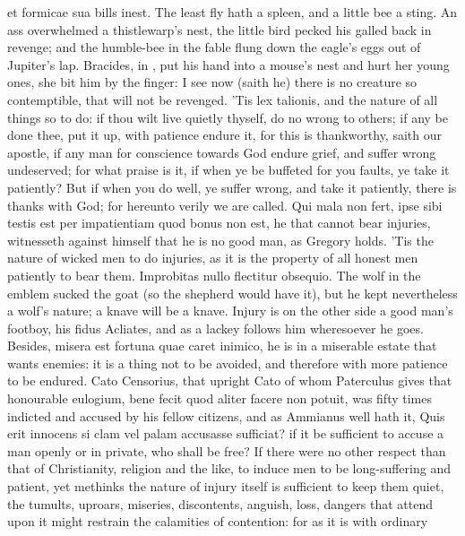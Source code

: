{et formicae sua bills inest. The least fly hath a spleen, and a little
bee a sting. An ass overwhelmed a thistlewarp's nest, the little
bird pecked his galled back in revenge; and the humble-bee in the fable
flung down the eagle's eggs out of Jupiter's lap. Bracides, in
\Plutarch, put his hand into a mouse's nest and hurt her young ones, she
bit him by the finger: I see now (saith he) there is no creature
so contemptible, that will not be revenged. 'Tis lex talionis, and the
nature of all things so to do: if thou wilt live quietly thyself,
do no wrong to others; if any be done thee, put it up, with
patience endure it, for this is thankworthy, saith our apostle,
if any man for conscience towards God endure grief, and suffer wrong
undeserved; for what praise is it, if when ye be buffeted for you
faults, ye take it patiently? But if when you do well, ye suffer wrong,
and take it patiently, there is thanks with God; for hereunto verily we
are called. Qui mala non fert, ipse sibi testis est per impatientiam
quod bonus non est, he that cannot bear injuries, witnesseth against
himself that he is no good man, as Gregory holds. 'Tis the nature
of wicked men to do injuries, as it is the property of all honest men
patiently to bear them. Improbitas nullo flectitur obsequio. The wolf
in the emblem sucked the goat (so the shepherd would have it),
but he kept nevertheless a wolf's nature; a knave will be a
knave. Injury is on the other side a good man's footboy, his fidus
Acliates, and as a lackey follows him wheresoever he goes. Besides,
misera est fortuna quae caret inimico, he is in a miserable estate that
wants enemies: it is a thing not to be avoided, and therefore
with more patience to be endured. Cato Censorius, that upright Cato of
whom Paterculus gives that honourable eulogium, bene fecit quod aliter
facere non potuit, was fifty times indicted and accused by his
fellow citizens, and as Ammianus well hath it, Quis erit innocens
si clam vel palam accusasse sufficiat? if it be sufficient to accuse a
man openly or in private, who shall be free? If there were no other
respect than that of Christianity, religion and the like, to induce men
to be long-suffering and patient, yet methinks the nature of injury
itself is sufficient to keep them quiet, the tumults, uproars,
miseries, discontents, anguish, loss, dangers that attend upon it might
restrain the calamities of contention: for as it is with ordinary
}
